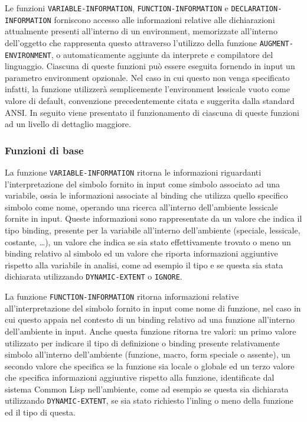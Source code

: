Le funzioni \texttt{VARIABLE-INFORMATION}, \texttt{FUNCTION-INFORMATION} e
\texttt{DECLARATION-INFORMATION} forniscono accesso alle informazioni relative
alle dichiarazioni attualmente presenti all’interno di un environment,
memorizzate all’interno dell’oggetto che rappresenta questo attraverso
l’utilizzo della funzione \texttt{AUGMENT-ENVIRONMENT}, o automaticamente
aggiunte da interprete e compilatore del linguaggio. Ciascuna di queste funzioni
può essere eseguita fornendo in input un parametro environment opzionale. Nel
caso in cui questo non venga specificato infatti, la funzione utilizzerà
semplicemente l’environment lessicale vuoto come valore di default, convenzione
precedentemente citata e suggerita dalla standard ANSI. In seguito viene
presentato il funzionamento di ciascuna di queste funzioni ad un livello di
dettaglio maggiore.

\subsubsection{Funzioni di base}

La funzione \texttt{VARIABLE-INFORMATION} ritorna le informazioni riguardanti
l’interpretazione del simbolo fornito in input come simbolo associato ad una
variabile, ossia le informazioni associate al binding che utilizza quello
specifico simbolo come nome, operando una ricerca all’interno dell'ambiente
lessicale fornite in input. Queste informazioni sono rappresentate da un valore
che indica il tipo binding, presente per la variabile all’interno dell’ambiente
(speciale, lessicale, costante, \dots), un valore che indica se sia stato
effettivamente trovato o meno un binding relativo al simbolo ed un valore che
riporta informazioni aggiuntive rispetto alla variabile in analisi, come ad
esempio il tipo e se questa sia stata dichiarata utilizzando
\texttt{DYNAMIC-EXTENT} o \texttt{IGNORE}.

La funzione \texttt{FUNCTION-INFORMATION} ritorna informazioni relative
all’interpretazione del simbolo fornito in input come nome di funzione, nel caso
in cui questo appaia nel contesto di un binding relativo ad una funzione
all’interno dell’ambiente in input. Anche questa funzione ritorna tre valori: un
primo valore utilizzato per indicare il tipo di definizione o binding presente
relativamente simbolo all’interno dell’ambiente (funzione, macro, form speciale
o assente), un secondo valore che specifica se la funzione sia locale o globale
ed un terzo valore che specifica informazioni aggiuntive rispetto alla funzione,
identificate dal sistema Common Lisp nell’ambiente, come ad esempio se questa
sia dichiarata utilizzando \texttt{DYNAMIC-EXTENT}, se sia stato richiesto
l’inling o meno della funzione ed il tipo di questa.

